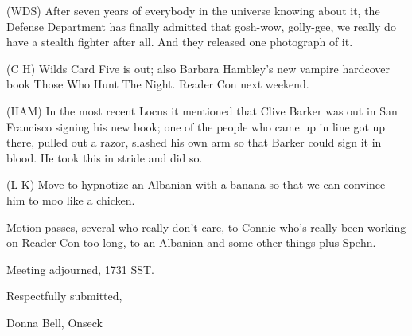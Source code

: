 \documentclass[12pt]{article}
\begin{document}
(WDS) After seven years of everybody in the universe knowing about it, the Defense Department has finally admitted that gosh-wow, golly-gee, we really do have a stealth fighter after all. And they released one photograph of it.

(C H) Wilds Card Five is out; also Barbara Hambley's new vampire hardcover book Those Who Hunt The Night. Reader Con next weekend.

(HAM) In the most recent Locus it mentioned that Clive Barker was out in San Francisco signing his new book; one of the people who came up in line got up there, pulled out a razor, slashed his own arm so that Barker could sign it in blood. He took this in stride and did so.

(L K) Move to hypnotize an Albanian with a banana so that we can convince him to moo like a chicken.

Motion passes, several who really don't care, to Connie who's really been working on Reader Con too long, to an Albanian and some other things plus Spehn.

\vspace{12pt}

\noindent
Meeting adjourned, 1731 SST.

\vspace{18pt}

\centerline{Respectfully submitted,}
\centerline{Donna Bell, Onseck}
\end{document}
